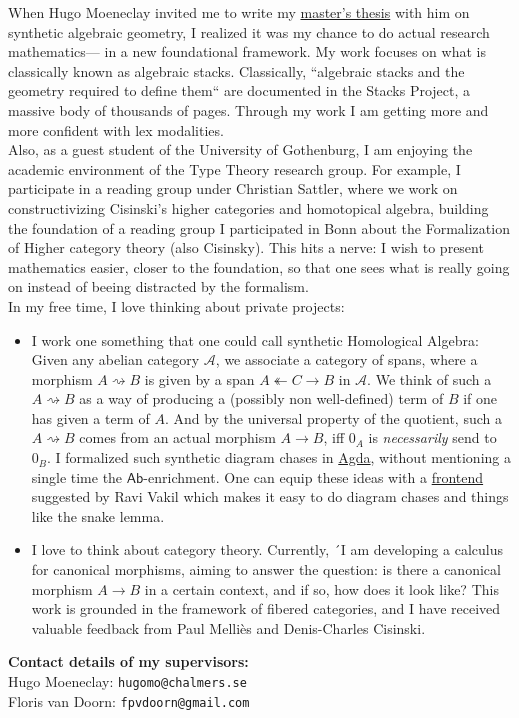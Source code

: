 \documentclass[12pt,headings=small,paper=A4,DIV=calc]{article}
\begin{document}
When Hugo Moeneclay invited me to write my \href{https://github.com/timlichtnau/MasterThesis/blob/Main}{master's thesis} with him on synthetic algebraic geometry, I realized it was my chance to do actual research mathematics--- in a new foundational framework. My work focuses on what is classically known as algebraic stacks. Classically, ``algebraic stacks and the geometry required to define them`` are documented in the Stacks Project, a massive body of thousands of pages. Through my work I am getting more and more confident with lex modalities. \\
Also, as a guest student of the University of Gothenburg, I am enjoying the academic environment of the Type Theory research group. For example, I participate in a reading group under Christian Sattler, where we work on constructivizing Cisinski's higher categories and homotopical algebra, building the foundation of a reading group I participated in Bonn about the Formalization of Higher category theory (also Cisinsky). This hits a nerve: I wish to present mathematics easier, closer to the foundation, so that one sees what is really going on instead of beeing distracted by the formalism. \\

In my free time, I love thinking about private projects: 
\begin{itemize}
	\item I work one something that one could call synthetic Homological Algebra: Given any abelian category $\mathcal{A}$, we associate a category of spans, where a morphism $A \rightsquigarrow B$ is given by a span $A \twoheadleftarrow C \to B$ in $\mathcal{A}$. We think of such a $A \rightsquigarrow B$ as a way of producing a (possibly non well-defined) term of $B$ if one has given a term of $A$. And by the universal property of the quotient, such a $A \rightsquigarrow B$ comes from an actual morphism $A \to B$, iff $0_A$ is \emph{necessarily} send to $0_B$. I formalized such synthetic diagram chases in \href{https://github.com/timlichtnau/CarpetsOnAgda/blob/master/}{Agda}, without mentioning a single time the $\mathsf{Ab}$-enrichment. One can equip these ideas with a \href{https://www.3blue1brown.com/content/blog/exact-sequence-picturebook/PuzzlingThroughExactSequences.pdf}{frontend} suggested by Ravi Vakil which makes it easy to do diagram chases and things like the snake lemma. 
	\item  I love to think about category theory. Currently, ´I am developing a calculus for canonical morphisms, aiming to answer the question: is there a canonical morphism $A \to B$ in a certain context, and if so, how does it look like? This work is grounded in the framework of fibered categories, and I have received valuable feedback from Paul Melliès and Denis-Charles Cisinski. \\
\end{itemize}

\textbf{Contact details of my supervisors:} \\
Hugo Moeneclay: \texttt{hugomo@chalmers.se} \\
Floris van Doorn: \texttt{fpvdoorn@gmail.com}
\end{document}
